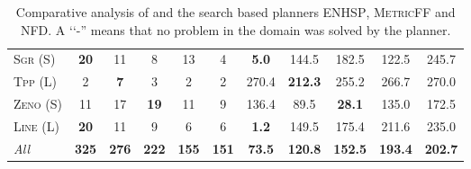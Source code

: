 \documentclass[11pt]{article}
\begin{document}
\begin{table}[tb]
{\begin{tabular}{|l||ccccc||ccccc||}
\textsc{Sgr} (S)&\textbf{20}&11&8&13&4&\textbf{5.0}&144.5&182.5&122.5&245.7\\
\textsc{Tpp} (L)&2&\textbf{7}&3&2&2&270.4&\textbf{212.3}&255.2&266.7&270.0\\
\textsc{Zeno} (S)&11&17&\textbf{19}&11&9&136.4&89.5&\textbf{28.1}&135.0&172.5\\
\textsc{Line} (L)&\textbf{20}&11&9&6&6&\textbf{1.2}&149.5&175.4&211.6&235.0
\\\hline
\textit{All}&\textbf{325}&\textbf{276}&\textbf{222}&\textbf{155}&\textbf{151}&\textbf{73.5}&\textbf{120.8}&\textbf{152.5}&\textbf{193.4}&\textbf{202.7}\\\hline

        \end{tabular}}
        \caption{Comparative analysis of \pattyf and the search based planners \textsc{ENHSP}, \textsc{MetricFF} and \textsc{NFD}. A ‘‘-” means that no problem in the domain was solved by the planner.}
        \label{tab:exp-search}
        \end{table}
        
\end{document}
